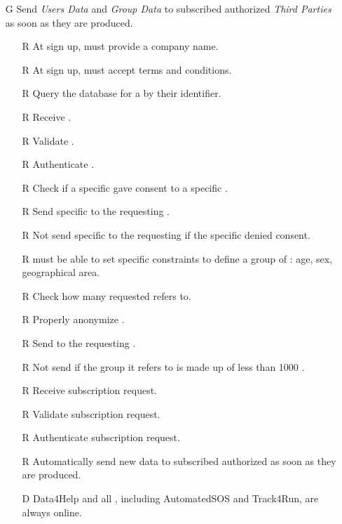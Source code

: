\documentclass[../../../rasd.tex]{subfiles}
\begin{document}
\begin{itemize}
    \item[G\subs{4}]Send \textit{Users Data} and \textit{Group Data} to subscribed authorized \textit{Third Parties} as soon as they are produced.
    \begin{itemize}
            \item[R\subs{3}]At sign up,  must provide a company name.
            \item[R\subs{5}]At sign up,  must accept terms and conditions.
        \item[R\subs{7}]Query the database for a  by their identifier.
        \item[R\subs{8}]Receive .
        \item[R\subs{9}]Validate .
        \item[R\subs{10}]Authenticate .
        \item[R\subs{18}]Check if a specific  gave consent to a specific .
        \item[R\subs{19}]Send specific to the requesting .
        \item[R\subs{20}]Not send specific to the requesting  if the specific  denied consent.
        \item[R\subs{21}] must be able to set specific constraints to define a group of : age, sex, geographical area.
        \item[R\subs{22}]Check how many  requested  refers to.
        \item[R\subs{23}]Properly anonymize .
        \item[R\subs{24}]Send  to the requesting .
        \item[R\subs{25}]Not send  if the group it refers to is made up of less than 1000 .
        \item[R\subs{26}]Receive  subscription request.
        \item[R\subs{27}]Validate  subscription request.
        \item[R\subs{28}]Authenticate  subscription request.
        \item[R\subs{29}]Automatically send new data to subscribed authorized  as soon as they are produced.
        \\
        \item[D\subs{9}]Data4Help and all , including AutomatedSOS and Track4Run, are always online.

\end{itemize}
\end{itemize}
\end{document}

